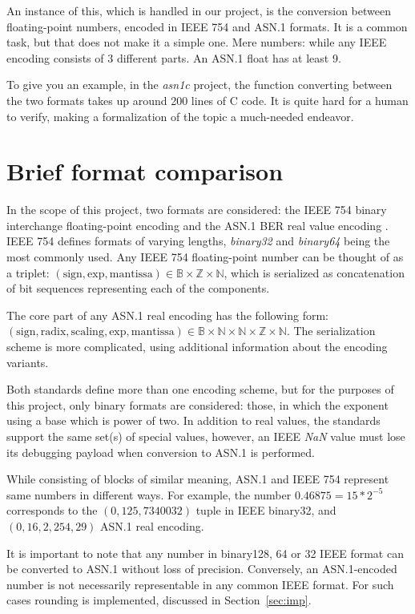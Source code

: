 \documentclass[sigplan]{acmart}
\newcommand{\N}{\mathbb{N}}
\newcommand{\Z}{\mathbb{Z}}
\newcommand{\bool}{\mathbb{B}}
\begin{document}
An instance of this, which is handled in our project, is the conversion between floating-point numbers, encoded in IEEE 754 and ASN.1 formats. It is a common task, but that does not make it a simple one. Mere numbers: while any IEEE encoding consists of 3 different parts. An ASN.1 float has at least 9.

To give you an example, in the \emph{asn1c} \cite{walkinopen} project, the function
converting between the two formats takes up around 200 lines of C code.
It is quite hard
for a human to verify, making a formalization of the topic a much-needed endeavor.

\section{Brief format comparison}

In the scope of this project, two formats are considered: the IEEE 754 binary
interchange floating-point encoding \cite{5976968} and the ASN.1 BER real value encoding \cite{ISO8825}.
IEEE 754 defines formats of varying lengths, \emph{binary32} and \emph{binary64}
being the most commonly used. Any IEEE 754 floating-point
number can be thought of as a triplet:
$(\mathrm{sign}, \mathrm{exp}, \mathrm{mantissa}) \in \bool \times \Z \times \N$,
which is serialized as concatenation of bit sequences representing each of the components.

The core part of any ASN.1 real encoding has the following form:
$ (\mathrm{sign},\mathrm{radix},\mathrm{scaling},\mathrm{exp},\mathrm{mantissa})
\in \bool \times \N \times \N \times \Z \times \N$.
The serialization scheme is more complicated, using additional
information about the encoding variants.

Both standards define more than one encoding scheme, but for the purposes of
this project, only binary formats are considered: those, in which the exponent using a base which is power of two. In addition to real values, the standards support the same set(s)
of special values, however, an
IEEE \emph{NaN} value must lose its debugging payload when conversion to
ASN.1 is performed.

While consisting of blocks of similar meaning, ASN.1 and IEEE 754 represent same numbers in different ways. For example, the number $0.46875 = 15*2^{-5}$ corresponds to the $(0, 125, 7340032)$ tuple in IEEE binary32, and $(0, 16, 2, 254, 29)$ ASN.1 real  encoding.

It is important to note that any number in binary128, 64 or 32 IEEE format can
be converted to ASN.1 without loss of precision. Conversely, an ASN.1-encoded
number is not necessarily representable in any common IEEE format. For such cases
rounding is implemented, discussed in Section~\ref{sec:imp}.
\end{document}
